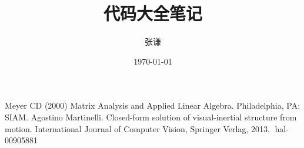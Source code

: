 \documentclass{article}
\title{代码大全笔记}
\author{张谦}
\date{\today}
\begin{document}
\maketitle
\tableofcontents
\newpage




\begin{thebibliography}{99}  
    Meyer CD (2000) Matrix Analysis and Applied Linear Algebra. Philadelphia, PA: SIAM.
     Agostino Martinelli. Closed-form solution of visual-inertial structure from motion. International
    Journal of Computer Vision, Springer Verlag, 2013. ￿hal-00905881
\end{thebibliography}
\end{document}
